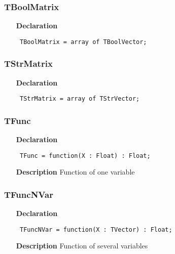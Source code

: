 \documentclass[12pt,a4paper,oneside]{report}
\newcommand{\declarationitem}[1]{\textbf{#1}}
\newcommand{\descriptiontitle}[1]{\textbf{#1}}
\newcommand{\code}[1]{\texttt{#1}}
\begin{document}
\subsubsection{TBoolMatrix}
\label{utypes-TBoolMatrix}
\begin{itemize}\item[\declarationitem{Declaration}\hfill]
	\begin{flushleft}
		\code{
			TBoolMatrix = array of TBoolVector;}
		
	\end{flushleft}
	
\end{itemize}
\subsubsection{TStrMatrix}
\label{utypes-TStrMatrix}
\begin{itemize}\item[\declarationitem{Declaration}\hfill]
	\begin{flushleft}
		\code{
			TStrMatrix  = array of TStrVector;}
		
	\end{flushleft}
	
\end{itemize}
\subsubsection{TFunc}
\label{utypes-TFunc}
\begin{itemize}\item[\declarationitem{Declaration}\hfill]
	\begin{flushleft}
		\code{
			TFunc = function(X : Float) : Float;}
		
	\end{flushleft}
	
	\par
	\item[\descriptiontitle{Description}]
	Function of one variable
	
\end{itemize}
\subsubsection{TFuncNVar}
\label{utypes-TFuncNVar}
\begin{itemize}\item[\declarationitem{Declaration}\hfill]
	\begin{flushleft}
		\code{
			TFuncNVar = function(X : TVector) : Float;}
		
	\end{flushleft}
	
	\par
	\item[\descriptiontitle{Description}]
	Function of several variables
	
\end{itemize}
\end{document}
